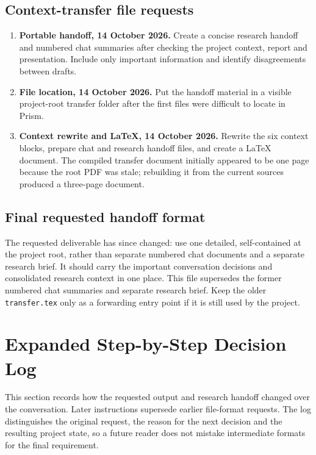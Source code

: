 \documentclass[10pt,a4paper]{article}
\begin{document}
\subsection{Context-transfer file requests}
\begin{enumerate}[label=\textbf{Chat \arabic*.},start=4]
\item \textbf{Portable handoff, 14 October 2026.} Create a concise research handoff and numbered chat summaries after checking the project context, report and presentation. Include only important information and identify disagreements between drafts.
\item \textbf{File location, 14 October 2026.} Put the handoff material in a visible project-root transfer folder after the first files were difficult to locate in Prism.
\item \textbf{Context rewrite and LaTeX, 14 October 2026.} Rewrite the six context blocks, prepare chat and research handoff files, and create a LaTeX document. The compiled transfer document initially appeared to be one page because the root PDF was stale; rebuilding it from the current sources produced a three-page document.
\end{enumerate}

\subsection{Final requested handoff format}
The requested deliverable has since changed: use one detailed, self-contained  at the project root, rather than separate numbered chat documents and a separate research brief. It should carry the important conversation decisions and consolidated research context in one place. This file supersedes the former numbered chat summaries and separate research brief. Keep the older \texttt{transfer.tex} only as a forwarding entry point if it is still used by the project.

\clearpage
\section{Expanded Step-by-Step Decision Log}
This section records how the requested output and research handoff changed over the conversation. Later instructions supersede earlier file-format requests. The log distinguishes the original request, the reason for the next decision and the resulting project state, so a future reader does not mistake intermediate formats for the final requirement.
\end{document}
